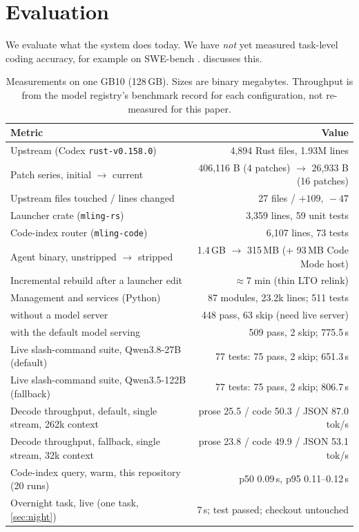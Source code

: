 \documentclass[11pt]{article}
\newcommand{\code}[1]{\texttt{#1}}
\begin{document}
\section{Evaluation}
\label{sec:eval}

We evaluate what the system does today. We have \emph{not} yet measured task-level coding accuracy,
for example on SWE-bench \cite{jimenez2024swebench}.  discusses this.

\begin{table}[t]
\centering
\small
\begin{tabular}{@{}l r@{}}
\toprule
Metric & Value \\
\midrule
Upstream (Codex \code{rust-v0.158.0}) & 4{,}894 Rust files, 1.93M lines \\
Patch series, initial $\rightarrow$ current & 406{,}116 B (4 patches) $\rightarrow$ 26{,}933 B (16 patches) \\
Upstream files touched / lines changed & 27 files / $+109,\ -47$ \\
Launcher crate (\code{mling-rs}) & 3{,}359 lines, 59 unit tests \\
Code-index router (\code{mling-code}) & 6{,}107 lines, 73 tests \\
Agent binary, unstripped $\rightarrow$ stripped & 1.4\,GB $\rightarrow$ 315\,MB (+ 93\,MB Code Mode host) \\
Incremental rebuild after a launcher edit & $\approx$7 min (thin LTO relink) \\
Management and services (Python) & 87 modules, 23.2k lines; 511 tests \\
\quad without a model server & 448 pass, 63 skip (need live server) \\
\quad with the default model serving & 509 pass, 2 skip; 775.5\,s \\
Live slash-command suite, Qwen3.8-27B (default) & 77 tests: 75 pass, 2 skip; 651.3\,s \\
Live slash-command suite, Qwen3.5-122B (fallback) & 77 tests: 75 pass, 2 skip; 806.7\,s \\
Decode throughput, default, single stream, 262k context & prose 25.5 / code 50.3 / JSON 87.0 tok/s \\
Decode throughput, fallback, single stream, 32k context & prose 23.8 / code 49.9 / JSON 53.1 tok/s \\
Code-index query, warm, this repository (20 runs) & p50 0.09\,s, p95 0.11--0.12\,s \\
Overnight task, live (one task, \cref{sec:night}) & 7\,s; test passed; checkout untouched \\
\bottomrule
\end{tabular}
\caption{Measurements on one GB10 (128\,GB). Sizes are binary megabytes. Throughput is from the
model registry's benchmark record for each configuration, not re-measured for this paper.}
\label{tab:eval}
\end{table}
\end{document}
